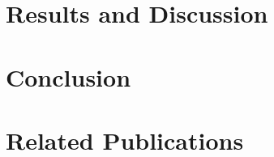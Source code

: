 \documentclass[11pt]{book}
\begin{document}
\chapter{Results and Discussion}
\label{ch:chap5}



\chapter{Conclusion}
\label{ch:conclusion}



\chapter*{Related Publications}
\label{ch:relatedPubs}




 
\end{document}
